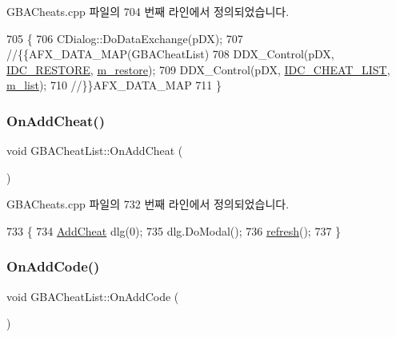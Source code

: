 G\+B\+A\+Cheats.\+cpp 파일의 704 번째 라인에서 정의되었습니다.


\begin{DoxyCode}
705 \{
706   CDialog::DoDataExchange(pDX);
707   \textcolor{comment}{//\{\{AFX\_DATA\_MAP(GBACheatList)}
708   DDX\_Control(pDX, \mbox{\hyperlink{resource_8h_a09933b49e9acdbb41201c83c1d20b85c}{IDC\_RESTORE}}, \mbox{\hyperlink{class_g_b_a_cheat_list_a4ed2a681da3265741caacda87cf36825}{m\_restore}});
709   DDX\_Control(pDX, \mbox{\hyperlink{resource_8h_a9e21f8b69374571cc4aa6ab5a8ce0b9b}{IDC\_CHEAT\_LIST}}, \mbox{\hyperlink{class_g_b_a_cheat_list_a00626f69b0783f81eaf76a4483ea76ed}{m\_list}});
710   \textcolor{comment}{//\}\}AFX\_DATA\_MAP}
711 \}
\end{DoxyCode}
\mbox{\label{class_g_b_a_cheat_list_a9e6ac22e19feef95ecd21881324e5d49}} 
\subsubsection{\texorpdfstring{On\+Add\+Cheat()}{OnAddCheat()}}
{\footnotesize\ttfamily void G\+B\+A\+Cheat\+List\+::\+On\+Add\+Cheat (\begin{DoxyParamCaption}{ }\end{DoxyParamCaption})\hspace{0.3cm}{\ttfamily [protected]}}



G\+B\+A\+Cheats.\+cpp 파일의 732 번째 라인에서 정의되었습니다.


\begin{DoxyCode}
733 \{
734   \mbox{\hyperlink{class_add_cheat}{AddCheat}} dlg(0);
735   dlg.DoModal();
736   \mbox{\hyperlink{class_g_b_a_cheat_list_a12928bb674926ae02d5a3ceb156a3b53}{refresh}}();
737 \}
\end{DoxyCode}
\mbox{\label{class_g_b_a_cheat_list_a6ac13ccfe979786032de5a836e9c35a6}} 
\subsubsection{\texorpdfstring{On\+Add\+Code()}{OnAddCode()}}
{\footnotesize\ttfamily void G\+B\+A\+Cheat\+List\+::\+On\+Add\+Code (\begin{DoxyParamCaption}{ }\end{DoxyParamCaption})\hspace{0.3cm}{\ttfamily [protected]}}



